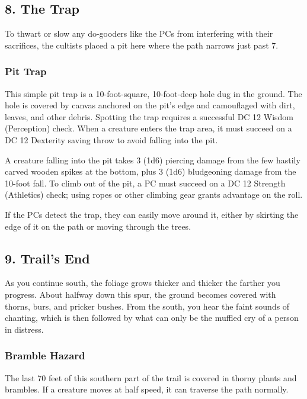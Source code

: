 \documentclass[10pt,a4paper,twoside,bg=print,twocolumn,openany,nodeprecatedcode]{dndbook}
\begin{document}
\subsection{8. The Trap}
To thwart or slow any do-gooders like the PCs from interfering with their sacrifices, the cultists placed a pit here where the path narrows just past 7.

\subsubsection{Pit Trap}
This simple pit trap is a 10-foot-square, 10-foot-deep hole dug in the ground. The hole is covered by canvas anchored on the pit's edge and camouflaged with dirt, leaves, and other debris. Spotting the trap requires a successful DC 12 Wisdom (Perception) check. When a creature enters the trap area, it must succeed on a DC 12 Dexterity saving throw to avoid falling into the pit.

A creature falling into the pit takes 3 (1d6) piercing damage from the few hastily carved wooden spikes at the bottom, plus 3 (1d6) bludgeoning damage from the 10-foot fall. To climb out of the pit, a PC must succeed on a DC 12 Strength (Athletics) check; using ropes or other climbing gear grants advantage on the roll.

If the PCs detect the trap, they can easily move around it, either by skirting the edge of it on the path or moving through the trees.

\subsection{9. Trail's End}
\begin{DndReadAloud}{}
As you continue south, the foliage grows thicker and thicker the farther you progress. About halfway down this spur, the ground becomes covered with thorns, burs, and pricker bushes. From the south, you hear the faint sounds of chanting, which is then followed by what can only be the muffled cry of a person in distress.

\end{DndReadAloud}

\subsubsection{Bramble Hazard}
The last 70 feet of this southern part of the trail is covered in thorny plants and brambles. If a creature moves at half speed, it can traverse the path normally.
\end{document}
